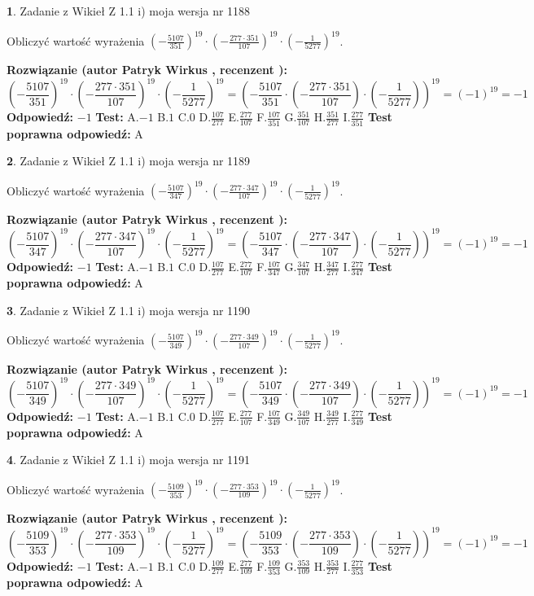 \documentclass[12pt, a4paper]{article}
\theoremstyle{definition} %
\newtheorem{zad}{}
\newcommand{\zadStart}[1]{\begin{zad}#1\newline}
\newcommand{\zadStop}{\end{zad}}
\newcommand{\rozwStart}[2]{\noindent \textbf{Rozwiązanie (autor #1 , recenzent #2): }\newline}
\newcommand{\rozwStop}{\newline}
\newcommand{\odpStart}{\noindent \textbf{Odpowiedź:}\newline}
\newcommand{\odpStop}{\newline}
\newcommand{\testStart}{\noindent \textbf{Test:}\newline}
\newcommand{\testStop}{\newline}
\newcommand{\kluczStart}{\noindent \textbf{Test poprawna odpowiedź:}\newline}
\newcommand{\kluczStop}{\newline}
\begin{document}
\zadStart{Zadanie z Wikieł Z 1.1 i) moja wersja nr 1188}

Obliczyć wartość wyrażenia $(-\frac{5107}{351})^{19} \cdot (-\frac{277 \cdot 351}{107})^{19} \cdot (-\frac{1}{5277})^{19}$.
\zadStop
\rozwStart{Patryk Wirkus}{}
$$(-\frac{5107}{351})^{19} \cdot (-\frac{277 \cdot 351}{107})^{19} \cdot (-\frac{1}{5277})^{19} = (-\frac{5107}{351} \cdot (-\frac{277 \cdot 351}{107}) \cdot (-\frac{1}{5277}))^{19} = (-1)^{19} = -1$$
\rozwStop
\odpStart
$-1$
\odpStop
\testStart
A.$-1$ B.$1$ C.$0$ D.$\frac{107}{277}$ E.$\frac{277}{107}$
F.$\frac{107}{351}$ G.$\frac{351}{107}$
H.$\frac{351}{277}$
I.$\frac{277}{351}$
\testStop
\kluczStart
A
\kluczStop



\zadStart{Zadanie z Wikieł Z 1.1 i) moja wersja nr 1189}

Obliczyć wartość wyrażenia $(-\frac{5107}{347})^{19} \cdot (-\frac{277 \cdot 347}{107})^{19} \cdot (-\frac{1}{5277})^{19}$.
\zadStop
\rozwStart{Patryk Wirkus}{}
$$(-\frac{5107}{347})^{19} \cdot (-\frac{277 \cdot 347}{107})^{19} \cdot (-\frac{1}{5277})^{19} = (-\frac{5107}{347} \cdot (-\frac{277 \cdot 347}{107}) \cdot (-\frac{1}{5277}))^{19} = (-1)^{19} = -1$$
\rozwStop
\odpStart
$-1$
\odpStop
\testStart
A.$-1$ B.$1$ C.$0$ D.$\frac{107}{277}$ E.$\frac{277}{107}$
F.$\frac{107}{347}$ G.$\frac{347}{107}$
H.$\frac{347}{277}$
I.$\frac{277}{347}$
\testStop
\kluczStart
A
\kluczStop



\zadStart{Zadanie z Wikieł Z 1.1 i) moja wersja nr 1190}

Obliczyć wartość wyrażenia $(-\frac{5107}{349})^{19} \cdot (-\frac{277 \cdot 349}{107})^{19} \cdot (-\frac{1}{5277})^{19}$.
\zadStop
\rozwStart{Patryk Wirkus}{}
$$(-\frac{5107}{349})^{19} \cdot (-\frac{277 \cdot 349}{107})^{19} \cdot (-\frac{1}{5277})^{19} = (-\frac{5107}{349} \cdot (-\frac{277 \cdot 349}{107}) \cdot (-\frac{1}{5277}))^{19} = (-1)^{19} = -1$$
\rozwStop
\odpStart
$-1$
\odpStop
\testStart
A.$-1$ B.$1$ C.$0$ D.$\frac{107}{277}$ E.$\frac{277}{107}$
F.$\frac{107}{349}$ G.$\frac{349}{107}$
H.$\frac{349}{277}$
I.$\frac{277}{349}$
\testStop
\kluczStart
A
\kluczStop



\zadStart{Zadanie z Wikieł Z 1.1 i) moja wersja nr 1191}

Obliczyć wartość wyrażenia $(-\frac{5109}{353})^{19} \cdot (-\frac{277 \cdot 353}{109})^{19} \cdot (-\frac{1}{5277})^{19}$.
\zadStop
\rozwStart{Patryk Wirkus}{}
$$(-\frac{5109}{353})^{19} \cdot (-\frac{277 \cdot 353}{109})^{19} \cdot (-\frac{1}{5277})^{19} = (-\frac{5109}{353} \cdot (-\frac{277 \cdot 353}{109}) \cdot (-\frac{1}{5277}))^{19} = (-1)^{19} = -1$$
\rozwStop
\odpStart
$-1$
\odpStop
\testStart
A.$-1$ B.$1$ C.$0$ D.$\frac{109}{277}$ E.$\frac{277}{109}$
F.$\frac{109}{353}$ G.$\frac{353}{109}$
H.$\frac{353}{277}$
I.$\frac{277}{353}$
\testStop
\kluczStart
A
\kluczStop
\end{document}
